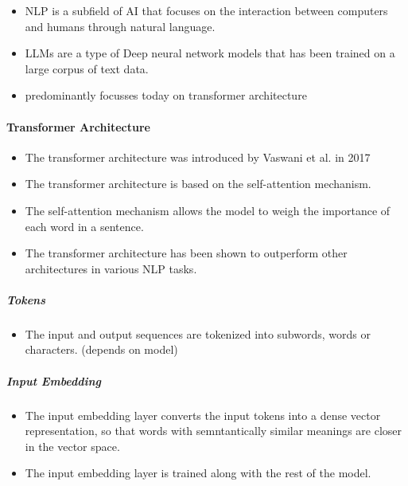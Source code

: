 
\begin{itemize}
    \item NLP is a subfield of AI that focuses on the interaction between computers and humans through natural language. 
    \item LLMs are a type of Deep neural network models that has been trained on a large corpus of text data.
    \item predominantly focusses today on transformer architecture 
\end{itemize}

\paragraph{Transformer Architecture}


\begin{itemize}
    \item The transformer architecture was introduced by Vaswani et al. in 2017 
    \item The transformer architecture is based on the self-attention mechanism.
    \item The self-attention mechanism allows the model to weigh the importance of each word in a sentence.
    \item The transformer architecture has been shown to outperform other architectures in various NLP tasks.
\end{itemize}


\subparagraph{Tokens}
\begin{itemize}
    \item The input and output sequences are tokenized into subwords, words or characters. (depends on model)
\end{itemize}
\subparagraph{Input Embedding}
\begin{itemize}
    \item The input embedding layer converts the input tokens into a dense vector representation, so that words with semntantically similar meanings are closer in the vector space.
    \item The input embedding layer is trained along with the rest of the model. 
\end{itemize}

